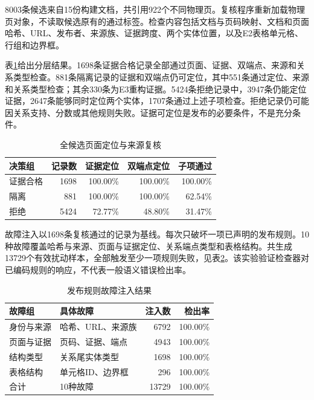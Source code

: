 \documentclass[conference,a4paper]{IEEEtran}
\begin{document}
8003条候选来自15份构建文档，共引用922个不同物理页。复核程序重新加载物理页对象，不读取候选原有的通过标签。检查内容包括文档与页码映射、文档和页面哈希、URL、发布者、来源族、证据跨度、两个实体位置，以及E2表格单元格、行组和边界框。

表\ref{tab:audit}给出分层结果。1698条证据合格记录全部通过页面、证据、双端点、来源和关系类型检查。881条隔离记录的证据和双端点仍可定位，其中551条通过定位、来源和关系类型检查；其余330条为E3重构证据。5424条拒绝记录中，3947条仍能定位证据，2647条能够同时定位两个实体，1707条通过上述子项检查。拒绝记录仍可能因关系支持、分数或其他规则失败。证据可定位是发布的必要条件，不是充分条件。

\begin{table}[t]
\caption{全候选页面定位与来源复核}
\label{tab:audit}
\centering
\fontsize{7.5}{8.5}\selectfont
\begin{tabular}{lrrrr}
\toprule
决策组 & 记录数 & 证据定位 & 双端点定位 & 子项通过 \\
\midrule
证据合格 & 1698 & 100.00\% & 100.00\% & 100.00\% \\
隔离     & 881  & 100.00\% & 100.00\% & 62.54\% \\
拒绝     & 5424 & 72.77\%  & 48.80\%  & 31.47\% \\
\bottomrule
\end{tabular}
\end{table}

故障注入以1698条复核通过的记录为基线。每次只破坏一项已声明的发布规则。10种故障覆盖哈希与来源、页面与证据定位、关系端点类型和表格结构。共生成13729个有效扰动样本，全部触发至少一项规则失败，见表\ref{tab:mutation}。该实验验证检查器对已编码规则的响应，不代表一般语义错误检出率。

\begin{table}[t]
\caption{发布规则故障注入结果}
\label{tab:mutation}
\centering
\fontsize{7.5}{8.5}\selectfont
\begin{tabular}{llrr}
\toprule
故障组 & 具体故障 & 注入数 & 检出率 \\
\midrule
身份与来源 & 哈希、URL、来源族 & 6792 & 100.00\% \\
页面与证据 & 页码、证据、端点 & 4943 & 100.00\% \\
结构类型   & 关系尾实体类型   & 1698 & 100.00\% \\
表格结构   & 单元格ID、边界框 & 296  & 100.00\% \\
\midrule
合计       & 10种故障         & 13729 & 100.00\% \\
\bottomrule
\end{tabular}
\end{table}
\end{document}
